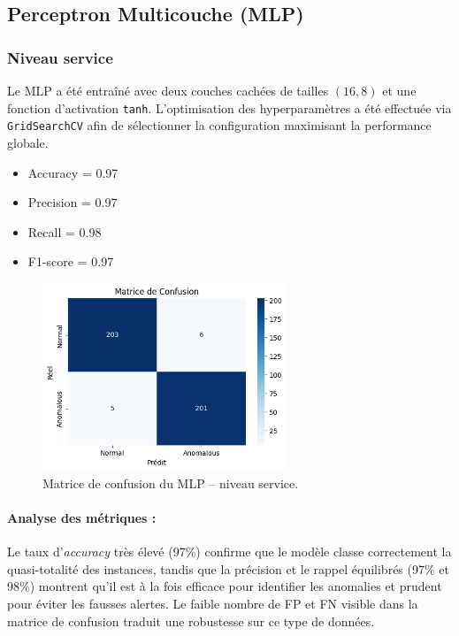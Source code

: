 \documentclass[a4paper,12pt]{report}
\begin{document}
\subsection{Perceptron Multicouche (MLP)}

\subsubsection*{Niveau service}

Le MLP a été entraîné avec deux couches cachées de tailles $(16, 8)$ et une fonction d’activation \texttt{tanh}.  
L’optimisation des hyperparamètres a été effectuée via \texttt{GridSearchCV} afin de sélectionner la configuration maximisant la performance globale.

\begin{itemize}
    \item Accuracy = 0.97
    \item Precision = 0.97
    \item Recall = 0.98
    \item F1-score = 0.97
\end{itemize}

\begin{figure}[H]
    \centering
    \includegraphics[width=0.65\textwidth]{images/confusion_matrix_mlp_service.png}
    \caption{Matrice de confusion du MLP – niveau service.}
\end{figure}

\paragraph{Analyse des métriques :}
Le taux d’\textit{accuracy} très élevé (97\%) confirme que le modèle classe correctement la quasi-totalité des instances, tandis que la précision et le rappel équilibrés (97\% et 98\%) montrent qu’il est à la fois efficace pour identifier les anomalies et prudent pour éviter les fausses alertes. Le faible nombre de FP et FN visible dans la matrice de confusion traduit une robustesse sur ce type de données.
\end{document}
